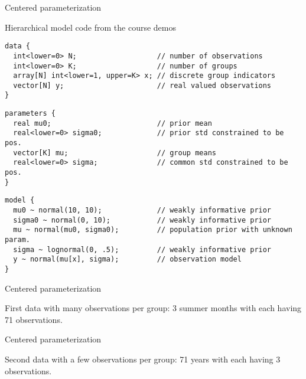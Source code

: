 \documentclass[finnish,english,t]{beamer}
\begin{document}
\begin{frame}[fragile]{Centered parameterization}

\vspace{-0.5\baselineskip}
Hierarchical model code from the course demos

{\footnotesize
\begin{verbatim}
data {
  int<lower=0> N;                   // number of observations
  int<lower=0> K;                   // number of groups
  array[N] int<lower=1, upper=K> x; // discrete group indicators
  vector[N] y;                      // real valued observations
}
\end{verbatim}
}
\pause
\vspace{-\baselineskip}
{\footnotesize
\begin{verbatim}
parameters {
  real mu0;                         // prior mean
  real<lower=0> sigma0;             // prior std constrained to be pos.
  vector[K] mu;                     // group means
  real<lower=0> sigma;              // common std constrained to be pos.
}
\end{verbatim}
}
\pause
\vspace{-\baselineskip}
{\footnotesize
\begin{verbatim}
model {
  mu0 ~ normal(10, 10);             // weakly informative prior
  sigma0 ~ normal(0, 10);           // weakly informative prior
  mu ~ normal(mu0, sigma0);         // population prior with unknown param.
  sigma ~ lognormal(0, .5);         // weakly informative prior
  y ~ normal(mu[x], sigma);         // observation model
}
\end{verbatim}
}
\end{frame}

\begin{frame}[fragile]{Centered parameterization}

  First data with many observations per group: 3 summer months with
  each having 71 observations.


  
\end{frame}

\begin{frame}[fragile]{Centered parameterization}

  Second data with a few observations per group: 71 years with
  each having 3 observations.


  
\end{frame}
\end{document}
